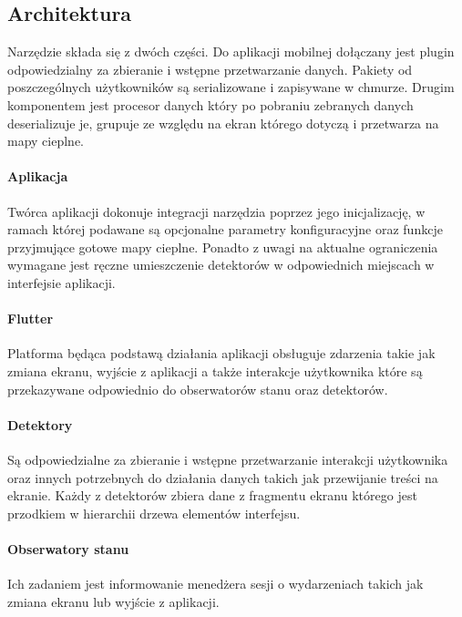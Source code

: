 \subsection{Architektura}
Narzędzie składa się z dwóch części. Do aplikacji mobilnej dołączany jest plugin odpowiedzialny za zbieranie i wstępne przetwarzanie danych. Pakiety od poszczególnych użytkowników są serializowane i zapisywane w chmurze. Drugim komponentem jest procesor danych który po pobraniu zebranych danych deserializuje je, grupuje ze względu na ekran którego dotyczą i przetwarza na mapy cieplne.


\paragraph{Aplikacja}
Twórca aplikacji dokonuje integracji narzędzia poprzez jego inicjalizację, w ramach której podawane są  opcjonalne parametry konfiguracyjne oraz funkcje przyjmujące gotowe mapy cieplne. Ponadto z uwagi na aktualne ograniczenia wymagane jest ręczne umieszczenie detektorów w odpowiednich miejscach w interfejsie aplikacji.

\paragraph{Flutter} Platforma będąca podstawą działania aplikacji obsługuje zdarzenia takie jak zmiana ekranu, wyjście z aplikacji a także interakcje użytkownika które są przekazywane odpowiednio do obserwatorów stanu oraz detektorów.

\paragraph{Detektory} 
\label{par:rs_detectors}
Są odpowiedzialne za zbieranie i wstępne przetwarzanie interakcji użytkownika oraz innych potrzebnych do działania danych takich jak przewijanie treści na ekranie. Każdy z detektorów zbiera dane z fragmentu ekranu którego jest przodkiem w hierarchii drzewa elementów interfejsu.

\paragraph{Obserwatory stanu} 
\label{par:rs_observers}
Ich zadaniem jest informowanie menedżera sesji o wydarzeniach takich jak zmiana ekranu lub wyjście z aplikacji.

